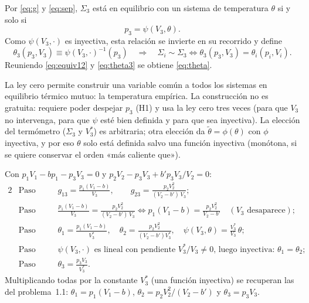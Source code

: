 \begin{demostracion}
 Por \eqref{eq:g} y \eqref{eq:sep}, $\Sigma_3$ está en
equilibrio con un sistema de temperatura $\theta$ si y solo si
\[
  p_3=\psi(V_3,\theta).
\]
Como $\psi(V_3,\cdot)$ es inyectiva, esta relación se invierte en su recorrido y define
\begin{equation}\label{eq:theta3}
  \theta_3(p_3,V_3)\equiv\psi(V_3,\cdot)^{-1}(p_3)\quad\Longrightarrow\quad
  \Sigma_i\sim\Sigma_3\iff\theta_3(p_3,V_3)=\theta_i(p_i,V_i).
\end{equation}
Reuniendo \eqref{eq:equiv12} y \eqref{eq:theta3} se obtiene \eqref{eq:theta}.
\end{demostracion}

\begin{observacion}
La ley cero permite construir una variable común a todos los sistemas en equilibrio térmico mutuo:
la temperatura empírica. La construcción no es gratuita: requiere poder despejar $p_3$ (H1) y usa la
ley cero tres veces (para que $V_3$ no intervenga, para que $\psi$ esté bien definida y para que sea
inyectiva). La elección del termómetro ($\Sigma_3$ y $V_3^*$) es arbitraria; otra elección da
$\tilde\theta=\phi(\theta)$ con $\phi$ inyectiva, y por eso $\theta$ solo está definida salvo una
función inyectiva (monótona, si se quiere conservar el orden «más caliente que»).
\end{observacion}

\begin{ejemplo}\label{ej:cinco}
Con $p_1V_1-bp_1-p_3V_3=0$ y $p_2V_2-p_3V_3+b'p_3V_3/V_2=0$:
\begin{alignat*}{2}
&\text{Paso 1:}\quad && g_{13}=\frac{p_1(V_1-b)}{V_3},\qquad g_{23}=\frac{p_2V_2^2}{(V_2-b')\,V_3};\\
&\text{Paso 2:}\quad && \frac{p_1(V_1-b)}{V_3}=\frac{p_2V_2^2}{(V_2-b')\,V_3}\iff p_1(V_1-b)=\frac{p_2V_2^2}{V_2-b'}\quad(V_3\text{ desaparece});\\
&\text{Paso 3:}\quad && \theta_1=\frac{p_1(V_1-b)}{V_3^*},\quad \theta_2=\frac{p_2V_2^2}{(V_2-b')V_3^*},\quad \psi(V_3,\theta)=\frac{V_3^*}{V_3}\,\theta;\\
&\text{Paso 4:}\quad && \psi(V_3,\cdot)\text{ es lineal con pendiente } V_3^*/V_3\neq0\text{, luego inyectiva: } \theta_1=\theta_2;\\
&\text{Paso 5:}\quad && \theta_3=\frac{p_3V_3}{V_3^*}.
\end{alignat*}
Multiplicando todas por la constante $V_3^*$ (una función inyectiva) se recuperan las del
problema~1.1: $\theta_1=p_1(V_1-b)$, $\theta_2=p_2V_2^2/(V_2-b')$ y $\theta_3=p_3V_3$.
\end{ejemplo}

